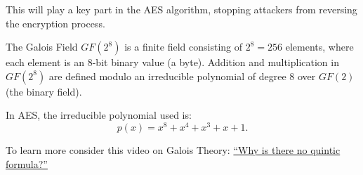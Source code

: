 \noindent
This will play a key part in the AES algorithm, stopping attackers from reversing the encryption process.

\newpage

\begin{Def}

    \label{def:galois_field}
    The Galois Field $GF(2^8)$ is a finite field consisting of $2^8 = 256$ elements, where each element is an 8-bit binary value (a byte).
    Addition and multiplication in $GF(2^8)$ are defined modulo an irreducible polynomial of degree 8 over $GF(2)$ (the binary field).
    
    \noindent
    In AES, the irreducible polynomial used is:
    \[
    p(x) = x^8 + x^4 + x^3 + x + 1.
    \]
\end{Def}

\vspace{-1em}
\begin{Tip}
    To learn more consider this video on Galois Theory: \href{https://www.youtube.com/watch?v=1EWUsef0iFs}{``Why is there no quintic formula?''}
\end{Tip}


